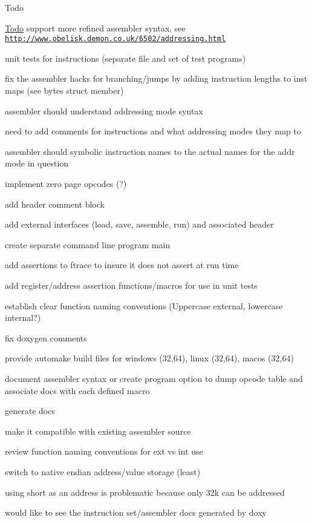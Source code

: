\begin{DoxyRefDesc}{Todo}
\item[\hyperlink{todo__todo000001}{Todo}]support more refined assembler syntax, see \href{http://www.obelisk.demon.co.uk/6502/addressing.html}{\tt http\-://www.\-obelisk.\-demon.\-co.\-uk/6502/addressing.\-html} 

unit tests for instructions (separate file and set of test programs) 

fix the assembler hacks for branching/jumps by adding instruction lengths to inst maps (see bytes struct member) 

assembler should understand addressing mode syntax 

need to add comments for instructions and what addressing modes they map to 

assembler should symbolic instruction names to the actual names for the addr mode in question 

implement zero page opcodes (?) 

add header comment block 

add external interfaces (load, save, assemble, run) and associated header 

create separate command line program main 

add assertions to ftrace to insure it does not assert at run time 

add register/address assertion functions/macros for use in unit tests 

establish clear function naming conventions (Uppercase external, lowercase internal?) 

fix doxygen comments 

provide automake build files for windows (32,64), linux (32,64), macos (32,64) 

document assembler syntax or create program option to dump opcode table and associate docs with each defined macro 

generate docs 

make it compatible with existing assembler source 

review function naming conventions for ext vs int use 

switch to native endian address/value storage (least) 

using short as an address is problematic because only 32k can be addressed 

would like to see the instruction set/assembler docs generated by doxy \end{DoxyRefDesc}

